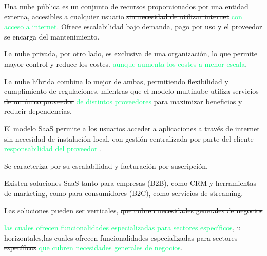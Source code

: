 


\begin{solution}
Una nube pública es un conjunto de recursos proporcionados por una entidad externa, accesibles a cualquier usuario 
\textcolor{samuraiRed}{\sout{sin necesidad de utilizar internet}} \textcolor{springGreen}{con acceso a internet}. Ofrece escalabilidad bajo demanda, pago por uso y el proveedor se encarga del mantenimiento.

La nube privada, por otro lado, es exclusiva de una organización, lo que permite mayor control y \textcolor{samuraiRed}{\sout{ reduce los costes.}} \textcolor{springGreen}{aunque aumenta los costes a menor escala}.

La nube híbrida combina lo mejor de ambas, permitiendo flexibilidad y cumplimiento de regulaciones, mientras que el modelo multinube utiliza servicios  \textcolor{samuraiRed}{\sout{de un único proveedor}} \textcolor{springGreen}{de distintos proveedores} para maximizar beneficios y reducir dependencias.

	
\vspace{2em}
\hrulefill
\vspace{2em}

El modelo SaaS permite a los usuarios acceder a aplicaciones a través de internet sin necesidad de instalación local, con gestión \textcolor{samuraiRed}{\sout{centralizada por parte del cliente}} \textcolor{springGreen}{responsabilidad del proveedor} .

Se caracteriza por su escalabilidad y facturación por suscripción.

Existen soluciones SaaS tanto para empresas (B2B), como CRM y herramientas de marketing, como para consumidores (B2C), como servicios de streaming.

Las soluciones pueden ser verticales,  \textcolor{samuraiRed}{\sout{que cubren necesidades generales de negocios}}

\textcolor{springGreen}{las cuales ofrecen funcionalidades especializadas para sectores específicos}, u horizontales,\textcolor{samuraiRed}{\sout{las cuales ofrecen funcionalidades especializadas para sectores específicos}} 
\textcolor{springGreen}{que cubren necesidades generales de negocios}.


\end{solution}
